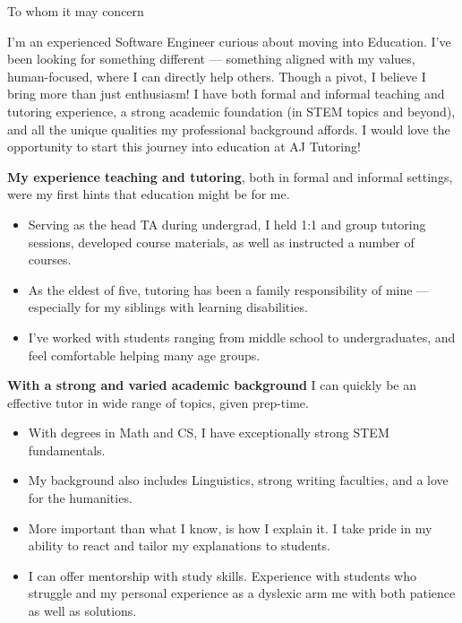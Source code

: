 \documentclass[sans, a4paper, 12pt]{article}
\newcommand{\cvcolor}[1]{{\color{MidnightBlue}#1}}
\renewcommand{\hl}[1]{\cvcolor{\textbf{#1}}}
\begin{document}
\begin{adjustwidth}{40pt}{40pt}

  To whom it may concern\par \bigskip


  I'm an experienced Software Engineer curious about moving into Education.
  I've been looking for something different --- something aligned with my
  values, human-focused, where I can directly help others.
  Though a pivot, I believe I bring more than just enthusiasm! I have both
  formal and informal teaching and tutoring experience, a strong academic
  foundation (in STEM topics and beyond), and all the unique qualities my
  professional background affords. I would love the opportunity to start this
  journey into education at AJ Tutoring!
  \medskip

  \hl{My experience teaching and tutoring}, both in formal and informal
  settings, were my first hints that education might be for me.
  \smallskip

  \begin{itemize}
    \item Serving as the head TA during undergrad, I held 1:1 and group
      tutoring sessions, developed course materials, as well as instructed a
      number of courses.
    \item As the eldest of five, tutoring has been a family responsibility of
      mine --- especially for my siblings with learning disabilities.
    \item I've worked with students ranging from middle school to
      undergraduates, and feel comfortable helping many age groups.
  \end{itemize}
  \smallskip

  \hl{With a strong and varied academic background} I can quickly be an
  effective tutor in wide range of topics, given prep-time.
  \smallskip

  \begin{itemize}
    \item With degrees in Math and CS, I have exceptionally strong STEM
      fundamentals.
    \item My background also includes Linguistics, strong writing faculties,
      and a love for the humanities.
    \item More important than what I know, is how I explain it. I take pride in
      my ability to react and tailor my explanations to students.
    \item I can offer mentorship with study skills. Experience with students
      who struggle and my personal experience as a dyslexic arm me with both
      patience as well as solutions.
  \end{itemize}
  \smallskip


\end{adjustwidth}
\end{document}
